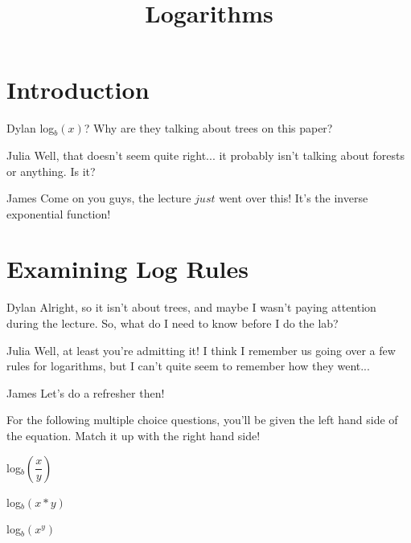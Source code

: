 \documentclass{ximera}
\title{Logarithms}
\begin{document}
\maketitle
\section{Introduction}
\begin{dialogue}
\item[Dylan] log$_b(x)$? Why are they talking about trees on this paper?
\item[Julia] Well, that doesn't seem quite right... it probably isn't talking about forests or anything. Is it?
\item[James] Come on you guys, the lecture $just$ went over this! It's the inverse exponential function!
\end{dialogue}

\section{Examining Log Rules}
\begin{dialogue}
\item[Dylan] Alright, so it isn't about trees, and maybe I wasn't paying attention during the lecture. So, what do I need to know before I do the lab?
\item[Julia] Well, at least you're admitting it! I think I remember us going over a few rules for logarithms, but I can't quite seem to remember how they went...
\item[James] Let's do a refresher then!
\end{dialogue}
For the following multiple choice questions, you'll be given the left hand side of the equation. Match it up with the right hand side!
\begin{question}
log$_b\left(\dfrac{x}{y}\right)$

\begin{multipleChoice}
\end{multipleChoice}

log$_b(x*y)$
\begin{multipleChoice}
\end{multipleChoice}

log$_b(x^y)$
\begin{multipleChoice}
\end{multipleChoice}
\end{question}
\end{document}
